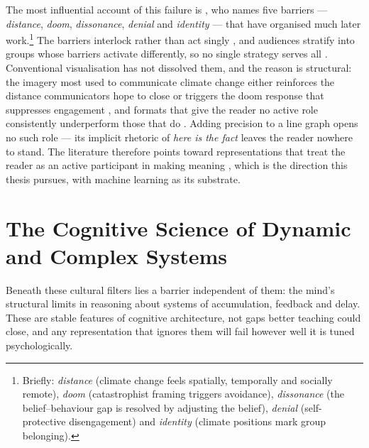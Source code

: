 The most influential account of this failure is \citet{stoknes2015}, who names five barriers --- \emph{distance}, \emph{doom}, \emph{dissonance}, \emph{denial} and \emph{identity} --- that have organised much later work.\footnote{Briefly: \emph{distance} (climate change feels spatially, temporally and socially remote), \emph{doom} (catastrophist framing triggers avoidance), \emph{dissonance} (the belief--behaviour gap is resolved by adjusting the belief), \emph{denial} (self-protective disengagement) and \emph{identity} (climate positions mark group belonging).} The barriers interlock rather than act singly \citep{vanderlinden2015}, and audiences stratify into groups whose barriers activate differently, so no single strategy serves all \citep{leiserowitz2021}. Conventional visualisation has not dissolved them, and the reason is structural: the imagery most used to communicate climate change either reinforces the distance communicators hope to close or triggers the doom response that suppresses engagement \citep{cornerclimate2015, nicholsoncole2005}, and formats that give the reader no active role consistently underperform those that do \citep{ojala2023}. Adding precision to a line graph opens no such role --- its implicit rhetoric of \emph{here is the fact} leaves the reader nowhere to stand. The literature therefore points toward representations that treat the reader as an active participant in making meaning \citep{marlon2019, morris2019}, which is the direction this thesis pursues, with machine learning as its substrate.

\section{The Cognitive Science of Dynamic and Complex Systems}
\label{sec:cognitive-science}

Beneath these cultural filters lies a barrier independent of them: the mind's structural limits in reasoning about systems of accumulation, feedback and delay. These are stable features of cognitive architecture, not gaps better teaching could close, and any representation that ignores them will fail however well it is tuned psychologically.

